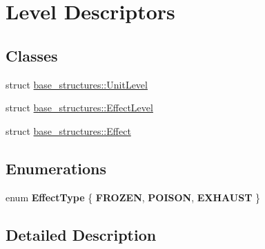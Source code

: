 \hypertarget{group__decsriptos}{}\section{Level Descriptors}
\label{group__decsriptos}
\subsection*{Classes}
\begin{DoxyCompactItemize}
\item 
struct \hyperlink{structbase__structures_1_1UnitLevel}{base\+\_\+structures\+::\+Unit\+Level}
\item 
struct \hyperlink{structbase__structures_1_1EffectLevel}{base\+\_\+structures\+::\+Effect\+Level}
\item 
struct \hyperlink{structbase__structures_1_1Effect}{base\+\_\+structures\+::\+Effect}
\end{DoxyCompactItemize}
\subsection*{Enumerations}
\begin{DoxyCompactItemize}
\item 
\mbox{\label{group__decsriptos_gad4b3764d53dbad072264f7d9b7397ebe}} 
enum {\bfseries Effect\+Type} \{ {\bfseries F\+R\+O\+Z\+EN}, 
{\bfseries P\+O\+I\+S\+ON}, 
{\bfseries E\+X\+H\+A\+U\+ST}
 \}
\end{DoxyCompactItemize}


\subsection{Detailed Description}
